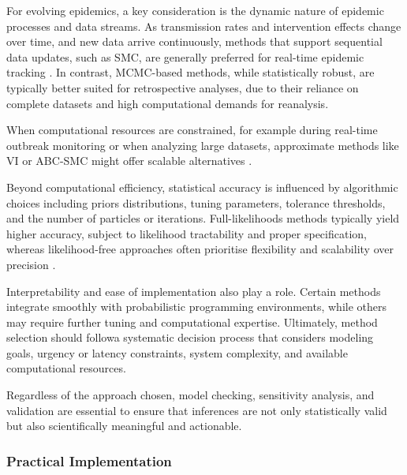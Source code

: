 \documentclass{article}
\begin{document}
For evolving epidemics, a key consideration is the dynamic nature of epidemic processes and data streams. As transmission rates and intervention effects change over time, and new data arrive continuously, methods that support sequential data updates, such as SMC, are generally preferred for real-time epidemic tracking \cite{birrell2020efficient, storvik2023sequential}. In contrast, MCMC-based methods, while statistically robust, are typically better suited for retrospective analyses, due to their reliance on complete datasets and high computational demands for reanalysis. 

 When computational resources are constrained, for example during real-time outbreak monitoring or when analyzing large datasets, approximate methods like VI or ABC-SMC might offer scalable alternatives \citep{chatzilena2019contemporary, engebretsen2023real}.

Beyond computational efficiency, statistical accuracy is influenced by algorithmic choices including priors distributions, tuning parameters, tolerance thresholds, and the number of particles or iterations. Full-likelihoods methods typically yield higher accuracy, subject to likelihood tractability and proper specification, whereas likelihood-free approaches often prioritise flexibility and scalability over precision \cite{alahmadi2020comparison}. 

Interpretability and ease of implementation also play a role. Certain methods integrate smoothly with probabilistic programming environments, while others may require further tuning and computational expertise. Ultimately, method selection should followa systematic decision process that considers modeling goals, urgency or latency constraints, system complexity, and available computational resources. 

Regardless of the approach chosen, model checking, sensitivity analysis, and validation are essential to ensure that inferences are not only statistically valid but also scientifically meaningful and actionable.



\subsubsection{Practical Implementation}
\end{document}
